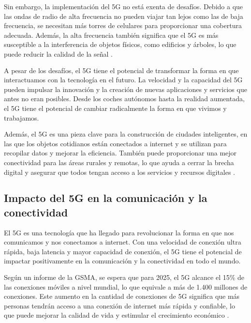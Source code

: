 \documentclass[12pt]{article}
\begin{document}
            Sin embargo, la implementación del 5G no está exenta de desafíos. Debido a que las ondas de radio de alta frecuencia no pueden viajar tan lejos como las de baja frecuencia, se necesitan más torres de celulares para proporcionar una cobertura adecuada. Además, la alta frecuencia también significa que el 5G es más susceptible a la interferencia de objetos físicos, como edificios y árboles, lo que puede reducir la calidad de la señal \cite{sherif2020mobile}.
            
            A pesar de los desafíos, el 5G tiene el potencial de transformar la forma en que interactuamos con la tecnología en el futuro. La velocidad y la capacidad del 5G pueden impulsar la innovación y la creación de nuevas aplicaciones y servicios que antes no eran posibles. Desde los coches autónomos hasta la realidad aumentada, el 5G tiene el potencial de cambiar radicalmente la forma en que vivimos y trabajamos.
            
            Además, el 5G es una pieza clave para la construcción de ciudades inteligentes, en las que los objetos cotidianos están conectados a internet y se utilizan para recopilar datos y mejorar la eficiencia. También puede proporcionar una mejor conectividad para las áreas rurales y remotas, lo que ayuda a cerrar la brecha digital y asegurar que todos tengan acceso a los servicios y recursos digitales \cite{sauter20185g}.
            
        \subsection{Impacto del 5G en la comunicación y la conectividad}

            El 5G es una tecnología que ha llegado para revolucionar la forma en que nos comunicamos y nos conectamos a internet. Con una velocidad de conexión ultra rápida, baja latencia y mayor capacidad de conexión, el 5G tiene el potencial de impactar positivamente en la comunicación y la conectividad en todo el mundo.
            
            Según un informe de la GSMA, se espera que para 2025, el 5G alcance el 15\% de las conexiones móviles a nivel mundial, lo que equivale a más de 1.400 millones de conexiones. Este aumento en la cantidad de conexiones de 5G significa que más personas tendrán acceso a una conexión de internet más rápida y confiable, lo que puede mejorar la calidad de vida y estimular el crecimiento económico \cite{davidson2019impact}.
            
\end{document}
